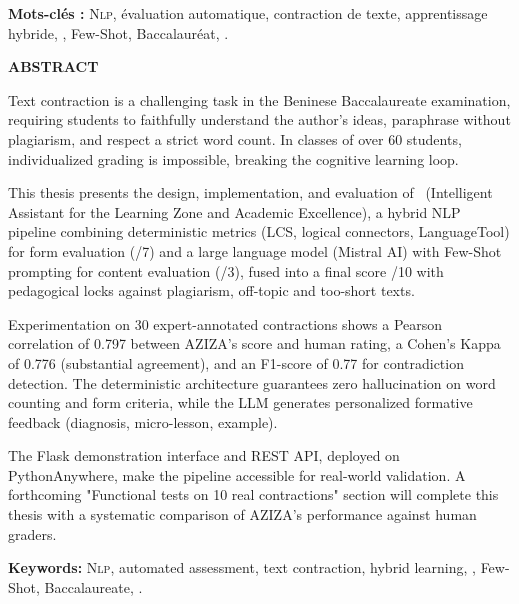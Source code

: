 \vspace{0.5cm}
\textbf{Mots-clés :} \textsc{Nlp}, évaluation automatique, contraction de texte, apprentissage hybride, \LLM, Few-Shot, Baccalauréat, \AZIZA.

\vfill
\clearpage
\thispagestyle{empty}

\vspace*{2cm}

\begin{center}
\Large \textbf{ABSTRACT}
\end{center}

\vspace{0.5cm}

Text contraction is a challenging task in the Beninese Baccalaureate examination, requiring students to faithfully understand the author's ideas, paraphrase without plagiarism, and respect a strict word count. In classes of over 60 students, individualized grading is impossible, breaking the cognitive learning loop.

This thesis presents the design, implementation, and evaluation of \AZIZA\ (Intelligent Assistant for the Learning Zone and Academic Excellence), a hybrid NLP pipeline combining deterministic metrics (LCS, logical connectors, LanguageTool) for form evaluation (/7) and a large language model (Mistral AI) with Few-Shot prompting for content evaluation (/3), fused into a final score /10 with pedagogical locks against plagiarism, off-topic and too-short texts.

Experimentation on 30 expert-annotated contractions shows a Pearson correlation of 0.797 between AZIZA's score and human rating, a Cohen's Kappa of 0.776 (substantial agreement), and an F1-score of 0.77 for contradiction detection. The deterministic architecture guarantees zero hallucination on word counting and form criteria, while the LLM generates personalized formative feedback (diagnosis, micro-lesson, example).

The Flask demonstration interface and REST API, deployed on PythonAnywhere, make the pipeline accessible for real-world validation. A forthcoming "Functional tests on 10 real contractions" section will complete this thesis with a systematic comparison of AZIZA's performance against human graders.

\vspace{0.5cm}
\textbf{Keywords:} \textsc{Nlp}, automated assessment, text contraction, hybrid learning, \LLM, Few-Shot, Baccalaureate, \AZIZA.
